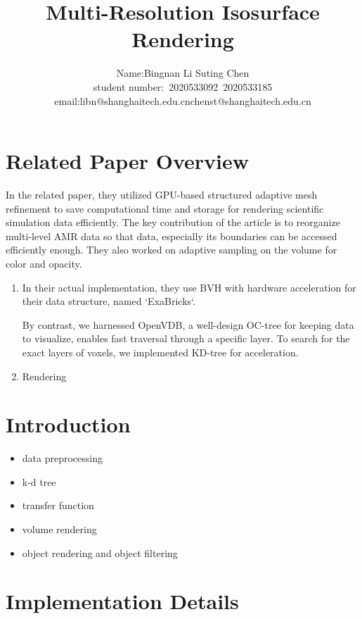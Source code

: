 \documentclass[acmtog]{acmart}
\title{Multi-Resolution Isosurface Rendering}
\author{Name:\quad Bingnan Li \quad Suting Chen \\ student number:\ 2020533092\ 2020533185
\\email:\quad libn@shanghaitech.edu.cn\quad chenst@shanghaitech.edu.cn}
\begin{document}
    \maketitle

    \vspace*{2 ex}


    \section{Related Paper Overview}\label{sec:related-paper-overview}
    In the related paper, they utilized GPU-based structured adaptive mesh refinement to save computational time and storage for rendering scientific simulation data efficiently.
    The key contribution of the article is to reorganize multi-level AMR data so that data, especially its boundaries can be accessed efficiently enough.
    They also worked on adaptive sampling on the volume for color and opacity.
    \begin{enumerate}
        \item In their actual implementation, they use BVH with hardware acceleration for their data structure, named `ExaBricks`.
        \par By contrast, we harnessed OpenVDB, a well-design OC-tree for keeping data to visualize, enables fast traversal through a specific layer. To search for the exact layers of voxels, we implemented KD-tree for acceleration.
        \item Rendering
    \end{enumerate}


    \section{Introduction}\label{sec:introduction}
    \begin{itemize}
        \item data preprocessing
        \item k-d tree
        \item transfer function
        \item volume rendering
        \item object rendering and object filtering
    \end{itemize}


    \section{Implementation Details}\label{sec:implementation-details}
\end{document}
